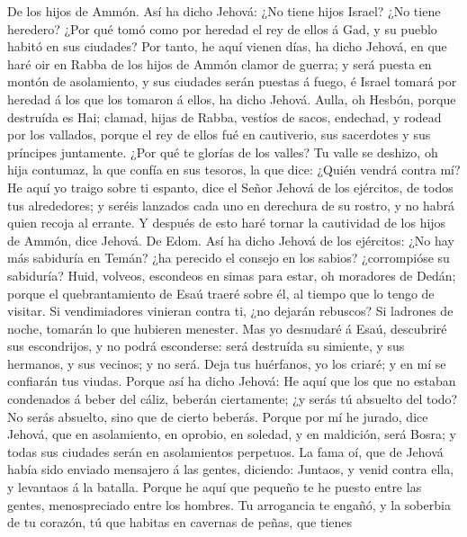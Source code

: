  De los hijos de Ammón. Así ha dicho Jehová: ¿No tiene
hijos Israel? ¿No tiene heredero? ¿Por qué tomó como por heredad el rey
de ellos á Gad, y su pueblo habitó en sus ciudades?  Por
tanto, he aquí vienen días, ha dicho Jehová, en que haré oir en Rabba de
los hijos de Ammón clamor de guerra; y será puesta en montón de
asolamiento, y sus ciudades serán puestas á fuego, é Israel tomará por
heredad á los que los tomaron á ellos, ha dicho Jehová. 
Aulla, oh Hesbón, porque destruída es Hai; clamad, hijas de Rabba,
vestíos de sacos, endechad, y rodead por los vallados, porque el rey de
ellos fué en cautiverio, sus sacerdotes y sus príncipes juntamente.
 ¿Por qué te glorías de los valles? Tu valle se deshizo,
oh hija contumaz, la que confía en sus tesoros, la que dice: ¿Quién
vendrá contra mí?  He aquí yo traigo sobre ti espanto,
dice el Señor Jehová de los ejércitos, de todos tus alrededores; y
seréis lanzados cada uno en derechura de su rostro, y no habrá quien
recoja al errante.  Y después de esto haré tornar la
cautividad de los hijos de Ammón, dice Jehová.  De Edom.
Así ha dicho Jehová de los ejércitos: ¿No hay más sabiduría en Temán?
¿ha perecido el consejo en los sabios? ¿corrompióse su sabiduría?
 Huid, volveos, escondeos en simas para estar, oh
moradores de Dedán; porque el quebrantamiento de Esaú traeré sobre él,
al tiempo que lo tengo de visitar.  Si vendimiadores
vinieran contra ti, ¿no dejarán rebuscos? Si ladrones de noche, tomarán
lo que hubieren menester.  Mas yo desnudaré á Esaú,
descubriré sus escondrijos, y no podrá esconderse: será destruída su
simiente, y sus hermanos, y sus vecinos; y no será.  Deja
tus huérfanos, yo los criaré; y en mí se confiarán tus viudas.
 Porque así ha dicho Jehová: He aquí que los que no
estaban condenados á beber del cáliz, beberán ciertamente; ¿y serás tú
absuelto del todo? No serás absuelto, sino que de cierto beberás.
 Porque por mí he jurado, dice Jehová, que en
asolamiento, en oprobio, en soledad, y en maldición, será Bosra; y todas
sus ciudades serán en asolamientos perpetuos.  La fama
oí, que de Jehová había sido enviado mensajero á las gentes, diciendo:
Juntaos, y venid contra ella, y levantaos á la batalla. 
Porque he aquí que pequeño te he puesto entre las gentes, menospreciado
entre los hombres.  Tu arrogancia te engañó, y la
soberbia de tu corazón, tú que habitas en cavernas de peñas, que tienes
